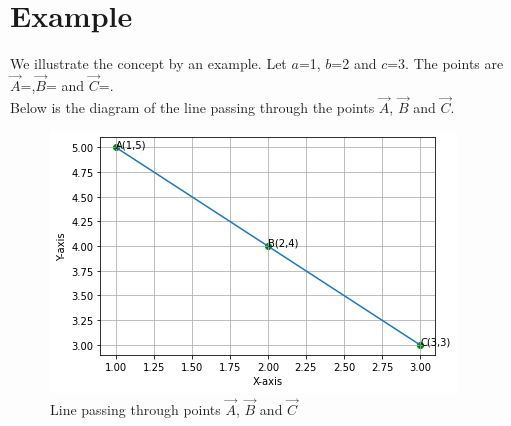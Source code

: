 \documentclass[journal,12pt,twocolumn]{IEEEtran}
\begin{document}
\section{Example}
We illustrate the concept by an example. Let $a$=1, $b$=2 and $c$=3. The points are $\vec{A}$=,$\vec{B}$= and $\vec{C}$=.\\ 
Below is the diagram of the line passing through the points $\vec{A}$, $\vec{B}$ and $\vec{C}$.
\renewcommand{\thefigure}{\arabic{figure}}
\begin{figure}[h!]
\centering
\includegraphics[width=\columnwidth]{Colinear.png}
\caption{Line passing through points $\vec{A}$, $\vec{B}$ and $\vec{C}$}
\label{myfig}
\end{figure}\\
\end{document}
